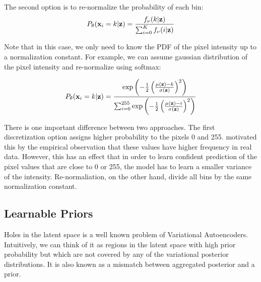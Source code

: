 The second option is to re-normalize the probability of each bin:
\begin{equation}\label{eq:intro_softmax_discr}
\begin{aligned}
    P_{\theta}(\rvx_i = k|\rvz) = \frac{f_{\nu}(k|\rvz)}{\sum_{i=0}^K f_{\nu}(i|\rvz)}
\end{aligned}
\end{equation}

Note that in this case, we only need to know the PDF of the pixel intensity up to a normalization constant. For example, we can assume gaussian distribution of the pixel intensity and re-normalize using softmax:

\begin{equation}
\begin{aligned}
    P_{\theta}({\mathbf{x}}_i = k|{\mathbf{z}}) = \frac{\exp\left(-\frac12 \left(\frac{\mu({\mathbf{z}}) - k}{\sigma({\mathbf{z}})}\right)^2\right)}{\sum_{i=0}^{255} \exp\left(-\frac12 \left(\frac{\mu({\mathbf{z}}) - i}{\sigma({\mathbf{z}})}\right)^2\right)}
\end{aligned}
\end{equation}

There is one important difference between two approaches. The first discretization option assigns higher probability to the pixels 0 and 255. \citet{salimans2016improved} motivated this by the empirical observation that these values have higher frequency in real data. However, this has an effect that in order to learn confident prediction of the pixel values that are close to 0 or 255, the model has to learn a smaller variance of the intensity. Re-normaliation, on the other hand, divide all bins by the same normalization constant.







\subsection{Learnable Priors}
Holes in the latent space is a well known problem of Variational Autoencoders. 
Intuitively, we can think of it as regions in the latent space with high prior probability but which are not covered by any of the variational posterior distributions. It is also known as a mismatch between aggregated posterior and a prior. 

